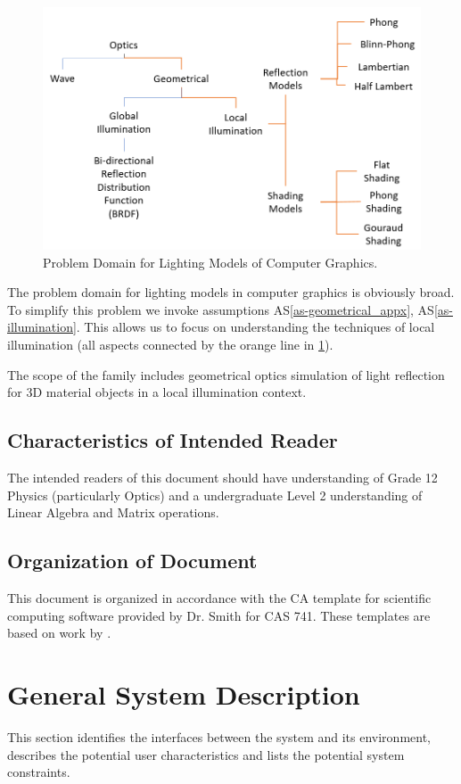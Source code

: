 \documentclass[12pt]{article}
\newcommand{\aSref}[1]{AS\ref{#1}}
\begin{document}
\begin{figure}[h]
	\centering
	\includegraphics[scale=0.5]{./images/problem-domain-analysis}
	\caption{Problem Domain for Lighting Models of Computer Graphics.}
	\label{fig:prob-domain-analysis}
\end{figure}

The problem domain for lighting models in computer graphics is obviously broad. 
To simplify this problem we invoke assumptions \aSref{as-geometrical_appx}, 
\aSref{as-illumination}. This allows us to focus on understanding the 
techniques of local illumination (all aspects connected by the orange line in 
\ref{fig:prob-domain-analysis}).

The scope of the family includes geometrical optics simulation of light 
reflection for 3D material objects in a local illumination context.

\subsection{Characteristics of Intended Reader}
The intended readers of this document should have understanding of Grade 12 
Physics (particularly Optics) and a undergraduate Level 2 understanding of 
Linear Algebra and Matrix operations.  

\subsection{Organization of Document}
This document is organized in accordance with the CA template for scientific 
computing software provided by Dr. Smith for CAS 741. These templates are based 
on work by \citet{Smith2006}.

\section{General System Description}
This section identifies the interfaces between the system and its environment,
describes the potential user characteristics and lists the potential system
constraints.
\end{document}
